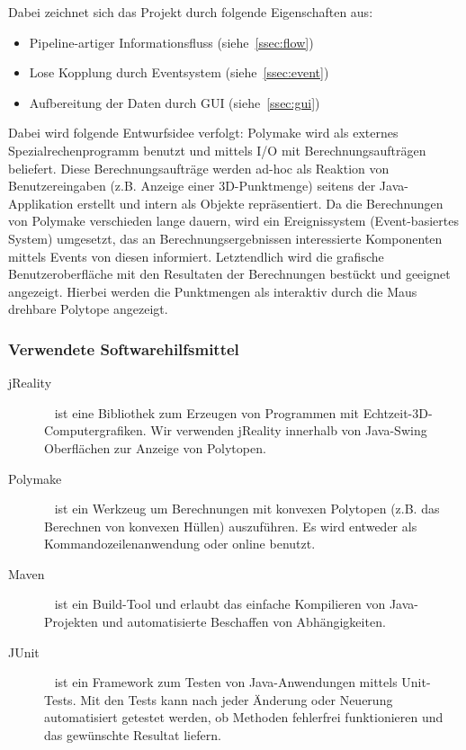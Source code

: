     Dabei zeichnet sich das Projekt durch folgende Eigenschaften aus:
    \begin{itemize}
        \item Pipeline-artiger Informationsfluss (siehe~\ref{ssec:flow})
        \item Lose Kopplung durch Eventsystem (siehe~\ref{ssec:event})
        \item Aufbereitung der Daten durch GUI (siehe~\ref{ssec:gui})
    \end{itemize}
    \noindent Dabei wird folgende Entwurfsidee verfolgt: Polymake wird als externes Spezialrechenprogramm benutzt und mittels I/O mit Berechnungsaufträgen beliefert.
    Diese Berechnungsaufträge werden ad-hoc als Reaktion von Benutzereingaben (z.B. Anzeige einer 3D-Punktmenge) seitens der Java-Applikation erstellt und intern als
    Objekte repräsentiert. Da die Berechnungen von Polymake verschieden lange dauern, wird ein Ereignissystem (Event-basiertes System) umgesetzt, das an Berechnungsergebnissen
    interessierte Komponenten mittels Events von diesen informiert. Letztendlich wird die grafische Benutzeroberfläche mit den Resultaten der Berechnungen bestückt und
    geeignet angezeigt. Hierbei werden die Punktmengen als interaktiv durch die Maus drehbare Polytope angezeigt.

    \subsubsection{Verwendete Softwarehilfsmittel}
       \begin{description}
           \item [jReality]
                ~\cite{jreality} ist eine Bibliothek zum Erzeugen von Programmen mit Echtzeit-3D-Computergrafiken. Wir verwenden jReality innerhalb von Java-Swing Oberflächen zur Anzeige von Polytopen.
           \item [Polymake]
           	~\cite{polymake} ist ein Werkzeug um Berechnungen mit konvexen Polytopen (z.B. das Berechnen von konvexen Hüllen) auszuführen. Es wird entweder als Kommandozeilenanwendung oder online benutzt.
           \item [Maven]
                ~\cite{maven} ist ein Build-Tool und erlaubt das einfache Kompilieren von Java-Projekten und automatisierte Beschaffen von Abhängigkeiten.
           \item [JUnit]
                ~\cite{jUnit} ist ein Framework zum Testen von Java-Anwendungen mittels Unit-Tests. Mit den Tests kann nach jeder Änderung oder Neuerung automatisiert getestet werden, ob Methoden fehlerfrei funktionieren und das gewünschte Resultat liefern.
        \end{description}

